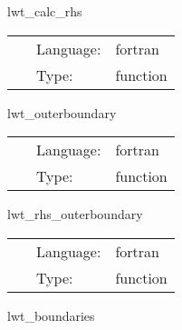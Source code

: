 
\hspace{5mm} lwt\_calc\_rhs 

\hspace{5mm}{\it calculate the rhs } 


\hspace{5mm}

 \begin{tabular*}{160mm}{cll} 
~ & Language:  & fortran \\ 
~ & Type:  & function \\ 
\end{tabular*} 


\vspace{5mm}


\hspace{5mm} lwt\_outerboundary 

\hspace{5mm}{\it apply outer boundaries } 


\hspace{5mm}

 \begin{tabular*}{160mm}{cll} 
~ & Language:  & fortran \\ 
~ & Type:  & function \\ 
\end{tabular*} 


\vspace{5mm}


\hspace{5mm} lwt\_rhs\_outerboundary 

\hspace{5mm}{\it apply mol rhs outer boundaries (eg. radiative boundary condition) } 


\hspace{5mm}

 \begin{tabular*}{160mm}{cll} 
~ & Language:  & fortran \\ 
~ & Type:  & function \\ 
\end{tabular*} 


\vspace{5mm}


\hspace{5mm} lwt\_boundaries 

